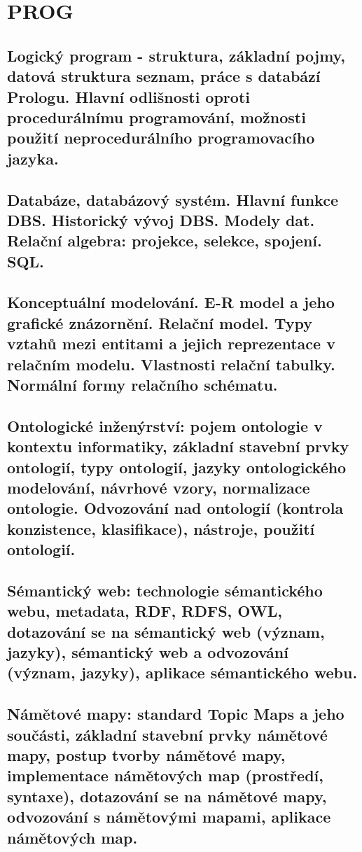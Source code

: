 
\chapter{PROG}

\section{ Logický program - struktura, základní pojmy, datová struktura seznam, práce s databází Prologu. Hlavní odlišnosti oproti procedurálnímu programování, možnosti použití neprocedurálního programovacího jazyka.}

\section{Databáze, databázový systém. Hlavní funkce DBS. Historický vývoj DBS. Modely dat. Relační algebra: projekce, selekce, spojení. SQL.}

\section{Konceptuální modelování. E-R model a jeho grafické znázornění. Relační model. Typy vztahů mezi entitami a jejich reprezentace v relačním modelu. Vlastnosti relační tabulky. Normální formy relačního schématu.}

\section{Ontologické inženýrství: pojem ontologie v kontextu informatiky, základní stavební prvky ontologií, typy ontologií, jazyky ontologického modelování, návrhové vzory, normalizace ontologie. Odvozování nad ontologií (kontrola konzistence, klasifikace), nástroje, použití ontologií.}

\section{Sémantický web: technologie sémantického webu, metadata, RDF, RDFS, OWL, dotazování se na sémantický web (význam, jazyky), sémantický web a odvozování (význam, jazyky), aplikace sémantického webu.}

\section{Námětové mapy: standard Topic Maps a jeho součásti, základní stavební prvky námětové mapy, postup tvorby námětové mapy, implementace námětových map (prostředí, syntaxe), dotazování se na námětové mapy, odvozování s námětovými mapami, aplikace námětových map.}


